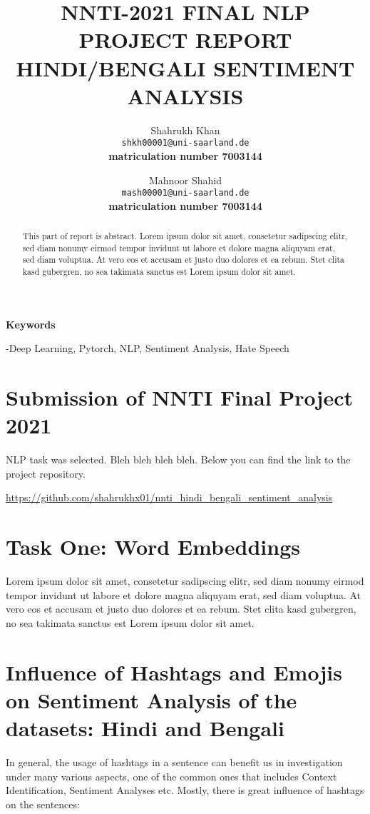 \documentclass{article}
\title{NNTI-2021 FINAL NLP PROJECT REPORT \newline 		HINDI/BENGALI SENTIMENT ANALYSIS}
\author{
  Shahrukh Khan\\
  \texttt{shkh00001@uni-saarland.de}\\
  \textbf{matriculation number 7003144}
  \and
  Mahnoor Shahid\\
  \texttt{mash00001@uni-saarland.de}\\
  \textbf{matriculation number 7003144}
}
\begin{document}
\maketitle


\begin{abstract}
 This part of report is abstract. Lorem ipsum dolor sit amet, consetetur sadipscing elitr, sed diam nonumy eirmod tempor invidunt ut labore et dolore magna aliquyam erat, sed diam voluptua. At vero eos et accusam et justo duo dolores et ea rebum. Stet clita kasd gubergren, no sea takimata sanctus est Lorem ipsum dolor sit amet.
\end{abstract}

\textbf{Keywords}
\begin{list}
    \item -Deep Learning, Pytorch, NLP, Sentiment Analysis, Hate Speech
\end{list}


\section{Submission of NNTI Final Project 2021}

NLP task was selected. Bleh bleh bleh bleh. Below you can find the link to the project repository. 
\begin{center}
  \url{https://github.com/shahrukhx01/nnti_hindi_bengali_sentiment_analysis}
\end{center}

\section{Task One: Word Embeddings}
\label{gen_inst}

Lorem ipsum dolor sit amet, consetetur sadipscing elitr, sed diam nonumy eirmod tempor invidunt ut labore et dolore magna aliquyam erat, sed diam voluptua. At vero eos et accusam et justo duo dolores et ea rebum. Stet clita kasd gubergren, no sea takimata sanctus est Lorem ipsum dolor sit amet.

\section{Influence of Hashtags and Emojis on Sentiment Analysis of the datasets: Hindi and Bengali }
\label{headings}

In general, the usage of hashtags in a sentence can benefit us in investigation under many various aspects, one of the common ones that includes Context Identification, Sentiment Analyses etc. Mostly, there is great influence of hashtags on the sentences:
\end{document}
